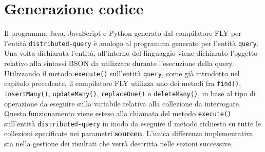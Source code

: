 \section{Generazione codice}
Il programma Java, JavaScript e Python generato dal compilatore FLY per l'entità \verb|distributed-query| è anologo al programma generato per l'entità \verb|query|. Una volta dichiarata l'entità, all'interno del linguaggio viene dichiarato l'oggetto relativo alla sintassi BSON da utilizzare durante l'esecuzione della query. Utilizzando il metodo \verb|execute()| sull'entità \verb|query|, come già introdotto nel capitolo precedente, il compilatore FLY utilizza uno dei metodi fra \verb|find()|, \verb|insertMany()|, \verb|updateMany()|, \verb|replaceOne()| o \verb|deleteMany()|, in base al tipo di operazione da eseguire sulla variabile relativa alla collezione da interrogare. Questo funzionamento viene esteso alla chiamata del metodo \verb|execute()| sull'entità \verb|distributed-query| in modo da eseguire il metodo richiesto su tutte le collezioni specificate nei parametri \textbf{source\textunderscore n}. L'unica differenza implementativa sta nella gestione dei risultati che verrà descritta nelle sezioni successive.

